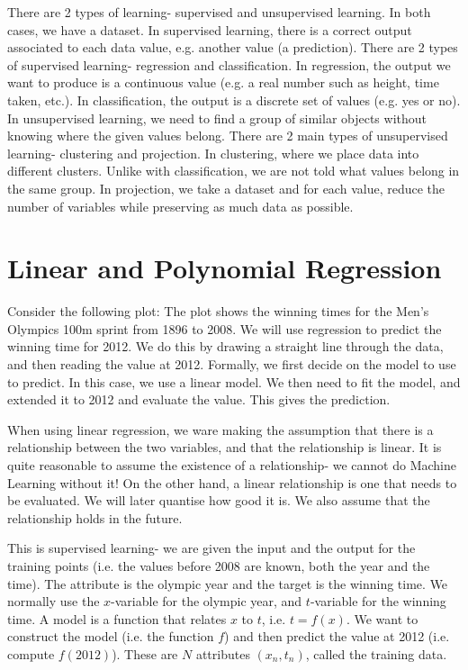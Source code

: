 \documentclass[a4paper, openany]{memoir}
\begin{document}
    There are 2 types of learning- supervised and unsupervised learning. In both cases, we have a dataset. In supervised learning, there is a correct output associated to each data value, e.g. another value (a prediction). There are 2 types of supervised learning- regression and classification. In regression, the output we want to produce is a continuous value (e.g. a real number such as height, time taken, etc.). In classification, the output is a discrete set of values (e.g. yes or no). In unsupervised learning, we need to find a group of similar objects without knowing where the given values belong. There are 2 main types of unsupervised learning- clustering and projection. In clustering, where we place data into different clusters. Unlike with classification, we are not told what values belong in the same group. In projection, we take a dataset and for each value, reduce the number of variables while preserving as much data as possible.
    \newpage

    \section{Linear and Polynomial Regression}
    Consider the following plot:
    The plot shows the winning times for the Men's Olympics 100m sprint from 1896 to 2008. We will use regression to predict the winning time for 2012. We do this by drawing a straight line through the data, and then reading the value at 2012. Formally, we first decide on the model to use to predict. In this case, we use a linear model. We then need to fit the model, and extended it to 2012 and evaluate the value. This gives the prediction.

    When using linear regression, we ware making the assumption that there is a relationship between the two variables, and that the relationship is linear. It is quite reasonable to assume the existence of a relationship- we cannot do Machine Learning without it! On the other hand, a linear relationship is one that needs to be evaluated. We will later quantise how good it is. We also assume that the relationship holds in the future.

    This is supervised learning- we are given the input and the output for the training points (i.e. the values before 2008 are known, both the year and the time). The attribute is the olympic year and the target is the winning time. We normally use the $x$-variable for the olympic year, and $t$-variable for the winning time. A model is a function that relates $x$ to $t$, i.e. $t = f(x)$. We want to construct the model (i.e. the function $f$) and then predict the value at 2012 (i.e. compute $f(2012)$). These are $N$ attributes $(x_n, t_n)$, called the training data.
\end{document}
